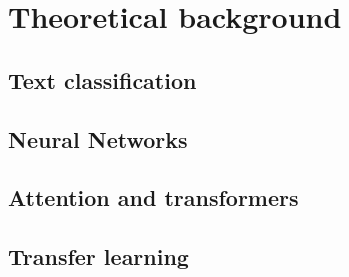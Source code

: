 \chapter{Theoretical background}
\section{Text classification}
\section{Neural Networks }
\section{Attention and transformers}\label{att_transformers}
\section{Transfer learning}
